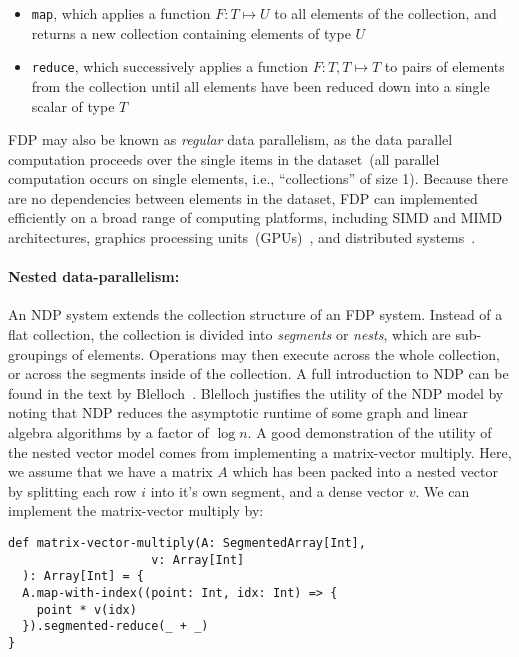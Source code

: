 \documentclass[preprint]{sigplanconf}
\theoremstyle{definition}
\begin{document}
\begin{itemize}
\item \texttt{map}, which applies a function $F: T \mapsto U$ to all elements of the collection, and
returns a new collection containing elements of type $U$
\item \texttt{reduce}, which successively applies a function $F: T, T \mapsto T$ to pairs of elements from
the collection until all elements have been reduced down into a single scalar of type $T$
\end{itemize}

FDP may also be known as \emph{regular} data parallelism, as the data parallel computation proceeds
over the single items in the dataset~(all parallel computation occurs on single elements, i.e.,
``collections'' of size 1). Because there are no dependencies between elements in the dataset, FDP can
implemented efficiently on a broad range of computing platforms, including SIMD and MIMD
architectures, graphics processing units~(GPUs)~\cite{nvidia08}, and distributed systems~\cite{dean04}.

\paragraph{Nested data-parallelism:}

An NDP system extends the collection structure of an FDP system. Instead of a flat collection, the
collection is divided into \emph{segments} or \emph{nests}, which are sub-groupings of elements.
Operations may then execute across the whole collection, or across the segments inside of the
collection. A full introduction to NDP can be found in the text by Blelloch~\cite{blelloch90thesis}. Blelloch
justifies the utility of the NDP model by noting that NDP reduces the asymptotic runtime of some graph
and linear algebra algorithms by a factor of $\log n$. A good demonstration of the utility of the nested
vector model comes from implementing a matrix-vector multiply. Here, we assume that we have a matrix
$A$ which has been packed into a nested vector by splitting each row $i$ into it's own segment, and a
dense vector $v$. We can implement the matrix-vector multiply by:

\begin{lstlisting}
def matrix-vector-multiply(A: SegmentedArray[Int],
					v: Array[Int]
  ): Array[Int] = {
  A.map-with-index((point: Int, idx: Int) => {
    point * v(idx)
  }).segmented-reduce(_ + _)
}
\end{lstlisting}
\end{document}
